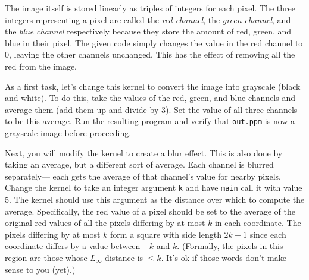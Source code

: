 \documentclass{article}
\begin{document}
The image itself is stored linearly as triples of integers for each
pixel.
The three integers representing a pixel are called the {\em red channel}, the
{\em green channel}, and the {\em blue channel} respectively because
they store the amount of red, green, and blue in their pixel.
The given code simply changes the value in the red channel to 0,
leaving the other channels unchanged.
This has the effect of removing all the red from the image. 

As a first task, let's change this kernel to convert the image into
grayscale (black and white).
To do this, take the values of the red, green, and blue channels and
average them (add them up and divide by 3).
Set the value of all three channels to be this average.
Run the resulting program and verify that {\tt out.ppm} is now a
grayscale image before proceeding.

Next, you will modify the kernel to create a blur effect.
This is also done by taking an average, but a different sort of average.
Each channel is blurred separately--- each gets the average of that
channel’s value for nearby pixels.
Change the kernel to take an integer argument {\tt k} and
have {\tt main} call it with value 5.
The kernel should use this argument as the distance over which to
compute the average. 
Specifically, the red value of a pixel should be set to the average of
the original red values of all the pixels differing by at most $k$ in each
coordinate.
The pixels differing by at most $k$ form a square with side
length $2k+1$ since each coordinate differs by a value between $-k$ and
$k$.
(Formally, the pixels in this region are those whose $L_\infty$
distance is $\leq k$.
It’s ok if those words don’t make sense to you (yet).)
\end{document}
